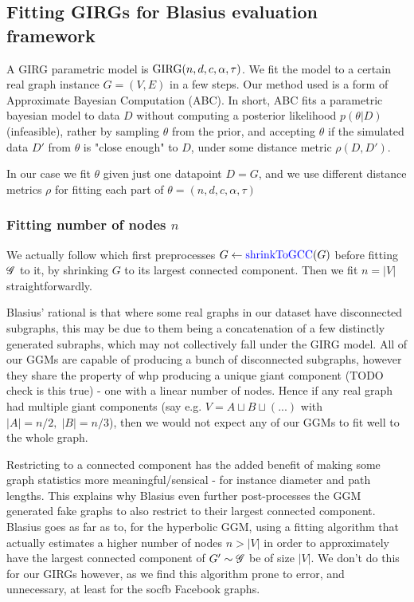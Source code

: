 
\subsection{Fitting GIRGs for Blasius evaluation framework}
A GIRG parametric model is $\operatorname{GIRG}(n, d, c, \alpha, \tau)$. We fit the model to a certain real graph instance $G = (V,E)$ in a few steps. Our method used is a form of Approximate Bayesian Computation (ABC). In short, ABC fits a parametric bayesian model to data $D$ without computing a posterior likelihood $p(\theta | D)$ (infeasible), rather by sampling $\theta$ from the prior, and accepting $\theta$ if the simulated data $D'$ from $\theta$ is "close enough" to $D$, under some distance metric $\rho(D, D')$.

In our case we fit $\theta$ given just one datapoint $D = G$, and we use different distance metrics $\rho$ for fitting each part of $\theta = (n, d, c, \alpha, \tau)$

\subsubsection{Fitting number of nodes $n$}

We actually follow \cite{blasius2018towards} which first preprocesses $G \gets \operatorname{\textcolor{blue}{shrinkToGCC}}(G)$ before fitting $\mathscr{G}$ to it, by shrinking $G$ to its largest connected component. Then we fit $n = |V|$ straightforwardly.


Blasius' rational is that where some real graphs in our dataset have disconnected subgraphs, this may be due to them being a concatenation of a few distinctly generated subraphs, which may not collectively fall under the GIRG model. All of our GGMs are capable of producing a bunch of disconnected subgraphs, however they share the property of whp producing a unique giant component (TODO check is this true) - one with a linear number of nodes. Hence if any real graph had multiple giant components (say e.g. $V = A \sqcup B \sqcup (...)$ with $|A| = n/2,\; |B| = n/3$), then we would not expect any of our GGMs to fit well to the whole graph.

Restricting to a connected component has the added benefit of making some graph statistics more meaningful/sensical - for instance diameter and path lengths. This explains why Blasius even further post-processes the GGM generated fake graphs to also restrict to their largest connected component. Blasius goes as far as to, for the hyperbolic GGM, using a fitting algorithm that actually estimates a higher number of nodes $n > |V|$ in order to approximately have the largest connected component of $G' \sim \mathscr{G}$ be of size $|V|$. We don't do this for our GIRGs however, as we find this algorithm prone to error, and unnecessary, at least for the socfb Facebook graphs.

